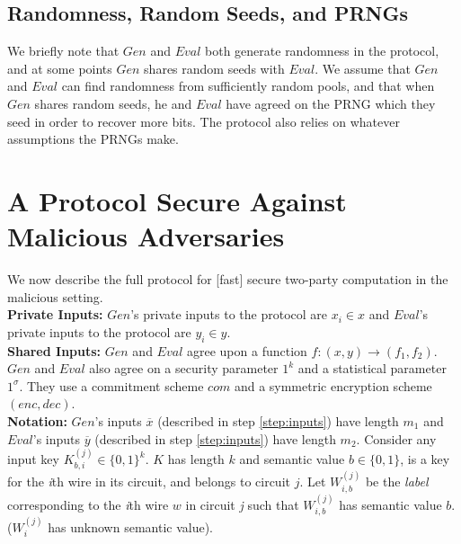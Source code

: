 \documentclass{article}
\begin{document}
\subsection{Randomness, Random Seeds, and PRNGs}
We briefly note that $Gen$ and $Eval$ both generate randomness in the protocol, and at some points $Gen$ shares random seeds with $Eval$. We assume that $Gen$ and $Eval$ can find randomness from sufficiently random pools, and that when $Gen$ shares random seeds, he and $Eval$ have agreed on the PRNG which they seed in order to recover more bits. The protocol also relies on whatever assumptions the PRNGs make.

\section{A Protocol Secure Against Malicious Adversaries}\label{sec:protocol}

We now describe the full protocol for [fast] secure two-party computation in the malicious setting.\\

\textbf{Private Inputs: }
$Gen$'s private inputs to the protocol are $x_{i} \in x$ and $Eval$'s private inputs to the protocol are $y_{i} \in y$.\\
\textbf{Shared Inputs: }
$Gen$ and $Eval$ agree upon a function $f : (x,y) \rightarrow (f_{1},f_{2})$.  $Gen$ and $Eval$ also agree on a security parameter $1^{k}$ and a statistical parameter $1^{\sigma}$. They use a commitment scheme $com$ and a symmetric encryption scheme $(enc,dec)$. \\
\textbf{Notation: }
$Gen$'s inputs $\overline{x}$ (described in step \ref{step:inputs}) have length $m_1$ and $Eval$'s inputs $\overline{y}$ (described in step \ref{step:inputs}) have length $m_2$.  Consider any input key $K_{b,i}^{(j)} \in \{0,1\}^{k}$. $K$ has length $k$ and semantic value $b \in \{0,1\}$, is a key for the \emph{i}th wire in its circuit, and belongs to circuit $j$. Let $W_{i,b}^{(j)}$ be the \emph{label} corresponding to the \emph{i}th wire $w$ in circuit \emph{j} such that $W_{i,b}^{(j)}$ has semantic value $b$. ($W_{i}^{(j)}$ has unknown semantic value).
\end{document}
